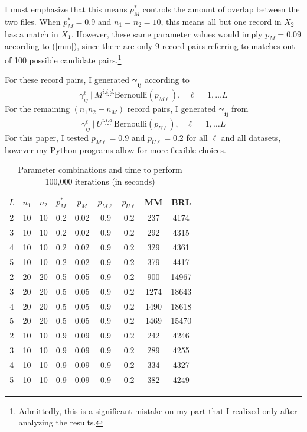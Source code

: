\documentclass[11pt,reqno]{amsart}
\newcommand\gamij{\mathbf{\gamma_{ij}}}
\begin{document}
I must emphasize that this means $p_M^*$ controls the amount of overlap between the two files.  When $p_M^* = 0.9$ and $n_1=n_2 = 10$, this means all but one record in $X_2$ has a match in $X_1$.  However, these same parameter values would imply $p_M = 0.09$ according to (\ref{mm}), since there are only 9 record pairs referring to matches out of 100 possible candidate pairs.\footnote{Admittedly, this is a significant mistake on my part that I realized only after analyzing the results.}

For these record pairs, I generated $\gamij$ according to
 $$\gamma_{ij}^{\ell} \ | \ M \overset{i.i.d.}{\sim}\text{Bernoulli}(p_{M\ell}), \hspace{10pt}\ell = 1,\dots L$$ 
For the remaining $(n_1n_2 - n_M)$ record pairs, I generated $\gamij$ from
  $$\gamma_{ij}^{\ell} \ | \ U \overset{i.i.d.}{\sim}\text{Bernoulli}(p_{U\ell}), \hspace{10pt}\ell = 1,\dots L$$ 
For this paper, I tested $p_{M\ell} = 0.9$ and $p_{U\ell}=0.2$ for all $\ell$ and all datasets, however my Python programs allow for more flexible choices.  

\begin{table}[h!]
\caption{Parameter combinations and time to perform 100,000 iterations (in seconds)}
\begin{center}
\begin{tabular}{ccccccc|cc}
\toprule
 $L$ &  $n_1$ &  $n_2$ &  $p_M^*$ &  $p_M$ & $p_{M\ell}$ &  $p_{U\ell}$ & MM & BRL \\
\midrule
 2 &  10 &  10 &  0.2 & 0.02 &  0.9 &  0.2 & 237 & 4174 \\
 3 &  10 &  10 &  0.2 & 0.02 & 0.9 &  0.2 & 292 & 4315 \\
 4 &  10 &  10 &  0.2 & 0.02 & 0.9 &  0.2 & 329 & 4361 \\ 
 5 &  10 &  10 &  0.2 & 0.02 & 0.9 &  0.2 & 379 & 4417 \\ 
 2 &  20 &  20 &  0.5 & 0.05 & 0.9 &  0.2 &  900 & 14967 \\ 
 3 &  20 &  20 &  0.5 & 0.05 & 0.9 &  0.2 & 1274 & 18643 \\ 
 4 &  20 &  20 &  0.5 & 0.05 & 0.9 &  0.2 & 1490 & 18618\\
 5 &  20 &  20 &  0.5 & 0.05 & 0.9 &  0.2 & 1469 & 15470 \\
 2 &  10 &  10 &  0.9 & 0.09 & 0.9 &  0.2 &  242 & 4246 \\
 3 &  10 &  10 &  0.9 & 0.09 & 0.9 &  0.2 & 289 & 4255 \\
 4 &  10 &  10 &  0.9 & 0.09 & 0.9 &  0.2 & 334 & 4327 \\
 5 &  10 &  10 &  0.9 & 0.09 & 0.9 &  0.2 & 382 & 4249 \\
\bottomrule
\end{tabular}
\end{center}
\label{params}
\end{table}%
\end{document}
